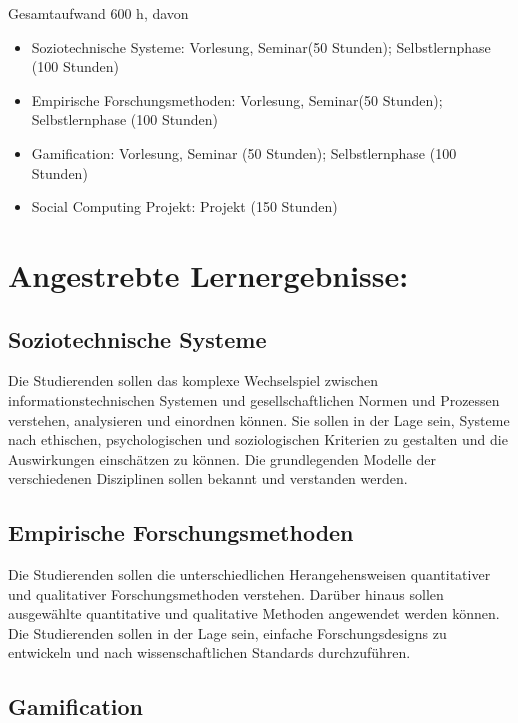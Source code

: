 Gesamtaufwand 600 h, davon

\begin{itemize}
\tightlist
\item
  Soziotechnische Systeme: Vorlesung, Seminar(50 Stunden);
  Selbstlernphase (100 Stunden)
\item
  Empirische Forschungsmethoden: Vorlesung, Seminar(50 Stunden);
  Selbstlernphase (100 Stunden)
\item
  Gamification: Vorlesung, Seminar (50 Stunden); Selbstlernphase (100
  Stunden)
\item
  Social Computing Projekt: Projekt (150 Stunden)
\end{itemize}

\section*{Angestrebte
Lernergebnisse:}\label{angestrebte-lernergebnisse-27}

\subsection*{Soziotechnische Systeme}\label{soziotechnische-systeme}

Die Studierenden sollen das komplexe Wechselspiel zwischen
informationstechnischen Systemen und gesellschaftlichen Normen und
Prozessen verstehen, analysieren und einordnen können. Sie sollen in der
Lage sein, Systeme nach ethischen, psychologischen und soziologischen
Kriterien zu gestalten und die Auswirkungen einschätzen zu können. Die
grundlegenden Modelle der verschiedenen Disziplinen sollen bekannt und
verstanden werden.

\subsection*{Empirische
Forschungsmethoden}\label{empirische-forschungsmethoden}

Die Studierenden sollen die unterschiedlichen Herangehensweisen
quantitativer und qualitativer Forschungsmethoden verstehen. Darüber
hinaus sollen ausgewählte quantitative und qualitative Methoden
angewendet werden können. Die Studierenden sollen in der Lage sein,
einfache Forschungsdesigns zu entwickeln und nach wissenschaftlichen
Standards durchzuführen.

\subsection*{Gamification}\label{gamification}

